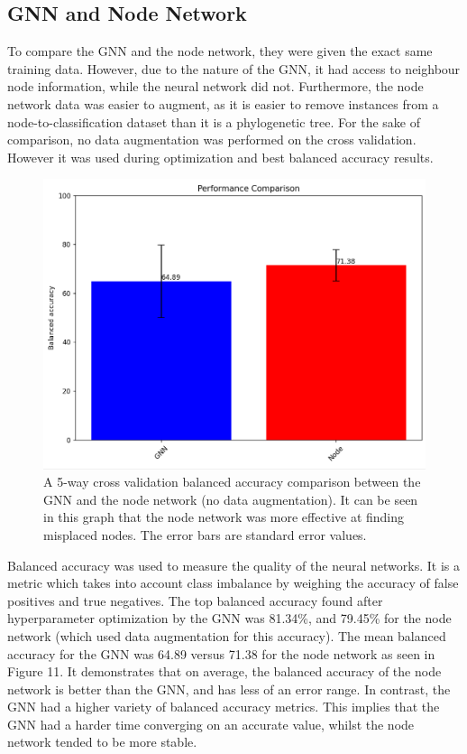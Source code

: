 \documentclass{mpaper}
\begin{document}
\subsection{GNN and Node Network}

To compare the GNN and the node network, they were given the exact same training data. However, due to the nature of the GNN, it had access to neighbour node information, while the neural network did not. Furthermore, the node network data was easier to augment, as it is easier to remove instances from a node-to-classification dataset than it is a phylogenetic tree. For the sake of comparison, no data augmentation was performed on the cross validation. However it was used during optimization and best balanced accuracy results. 

\begin{figure}
    \includegraphics[width=1\linewidth]{dissertation/images/gnn_node_performance_comparison.png}
    \centering
    \caption{A 5-way cross validation balanced accuracy comparison between the GNN and the node network (no data augmentation). It can be seen in this graph that the node network was more effective at finding misplaced nodes. The error bars are standard error values.}
\end{figure}

Balanced accuracy was used to measure the quality of the neural networks. It is a metric which takes into account class imbalance by weighing the accuracy of false positives and true negatives. The top balanced accuracy found after hyperparameter optimization by the GNN was 81.34\%, and 79.45\% for the node network (which used data augmentation for this accuracy). The mean balanced accuracy for the GNN was 64.89 versus 71.38 for the node network as seen in Figure 11. It demonstrates that on average, the balanced accuracy of the node network is better than the GNN, and has less of an error range. In contrast, the GNN had a higher variety of balanced accuracy metrics. This implies that the GNN had a harder time converging on an accurate value, whilst the node network tended to be more stable. 
\end{document}
